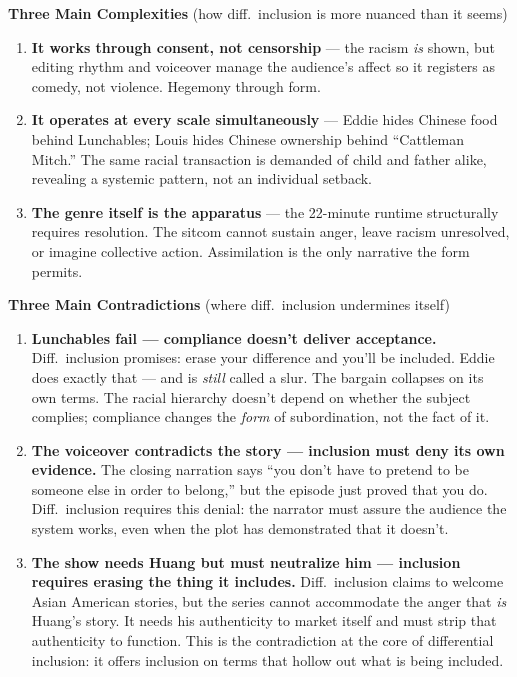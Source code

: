 \documentclass[12pt]{article}
\begin{document}
\vspace{8pt}

\textbf{Three Main Complexities} {\small (how diff.\ inclusion is more nuanced than it seems)}

\begin{enumerate}\setlength{\itemsep}{2pt}
\item \textbf{It works through consent, not censorship} --- the racism \textit{is} shown, but editing rhythm and voiceover manage the audience's affect so it registers as comedy, not violence. Hegemony through form.
\item \textbf{It operates at every scale simultaneously} --- Eddie hides Chinese food behind Lunchables; Louis hides Chinese ownership behind ``Cattleman Mitch.'' The same racial transaction is demanded of child and father alike, revealing a systemic pattern, not an individual setback.
\item \textbf{The genre itself is the apparatus} --- the 22-minute runtime structurally requires resolution. The sitcom cannot sustain anger, leave racism unresolved, or imagine collective action. Assimilation is the only narrative the form permits.
\end{enumerate}

\vspace{8pt}

\textbf{Three Main Contradictions} {\small (where diff.\ inclusion undermines itself)}

\begin{enumerate}\setlength{\itemsep}{2pt}
\item \textbf{Lunchables fail --- compliance doesn't deliver acceptance.} Diff.\ inclusion promises: erase your difference and you'll be included. Eddie does exactly that --- and is \textit{still} called a slur. The bargain collapses on its own terms. The racial hierarchy doesn't depend on whether the subject complies; compliance changes the \textit{form} of subordination, not the fact of it.
\item \textbf{The voiceover contradicts the story --- inclusion must deny its own evidence.} The closing narration says ``you don't have to pretend to be someone else in order to belong,'' but the episode just proved that you do. Diff.\ inclusion requires this denial: the narrator must assure the audience the system works, even when the plot has demonstrated that it doesn't.
\item \textbf{The show needs Huang but must neutralize him --- inclusion requires erasing the thing it includes.} Diff.\ inclusion claims to welcome Asian American stories, but the series cannot accommodate the anger that \textit{is} Huang's story. It needs his authenticity to market itself and must strip that authenticity to function. This is the contradiction at the core of differential inclusion: it offers inclusion on terms that hollow out what is being included.
\end{enumerate}
\end{document}
